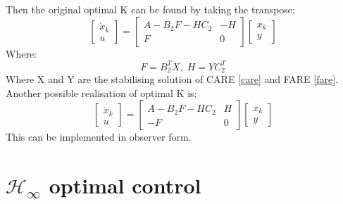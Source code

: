 \documentclass{article}
\begin{document}
Then the original optimal K can be found by taking the transpose:
\[
\begin{bmatrix}
    \dot x_k \\ u
\end{bmatrix}
= \begin{bmatrix}
    A-B_2F - HC_2 & -H \\
    F & 0
\end{bmatrix}
\begin{bmatrix}
    x_k \\ y
\end{bmatrix}
\]
Where:
\[
F = B_2^TX, \; H = YC_2^T
\]
Where X and Y are the stabilising solution of CARE \eqref{care} and FARE \eqref{fare}.
\\
Another possible realisation of optimal K is:
\[
\begin{bmatrix}
    \dot x_k \\ u
\end{bmatrix}
= \begin{bmatrix}
    A-B_2F - HC_2 & H \\
    -F & 0
\end{bmatrix}
\begin{bmatrix}
    x_k \\ y
\end{bmatrix}
\]
This can be implemented in observer form.
\section{\texorpdfstring{$\mathcal{H}_\infty$}. optimal control}
\end{document}
